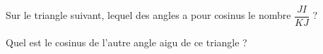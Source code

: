 
\begin{exercice}\label{exo2smath-0232}

    Sur le triangle suivant, lequel des angles a pour cosinus le nombre \( \dfrac{ JI }{ KJ }\) ?

\begin{center}
   
\end{center}

Quel est le cosinus de l'autre angle aigu de ce triangle ?

\end{exercice}
